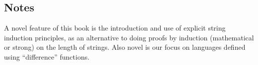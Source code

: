\subsection{Notes}

A novel feature of this book is the introduction and use of explicit
string induction principles, as an alternative to doing proofs by
induction (mathematical or strong) on the length of strings.  Also
novel is our focus on languages defined using ``difference''
functions.

